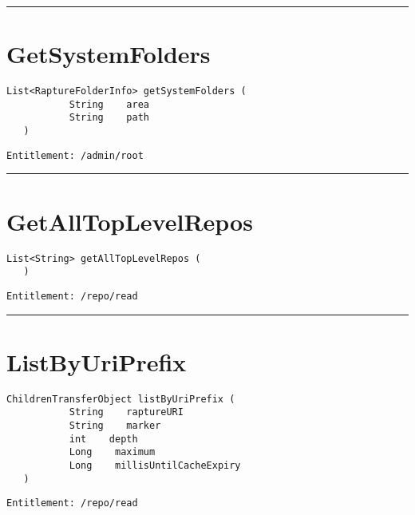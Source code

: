 \rule{12cm}{2pt}
\section{GetSystemFolders}
\label{Api:GetSystemFolders}
\begin{lstlisting}[style=nonumbers]
   List<RaptureFolderInfo> getSystemFolders (
           String    area
           String    path
   )
\end{lstlisting}
\begin{Verbatim}[formatcom=\color{Maroon}]
  Entitlement: /admin/root
\end{Verbatim}



\rule{12cm}{2pt}
\section{GetAllTopLevelRepos}
\label{Api:GetAllTopLevelRepos}
\begin{lstlisting}[style=nonumbers]
   List<String> getAllTopLevelRepos (
   )
\end{lstlisting}
\begin{Verbatim}[formatcom=\color{Maroon}]
  Entitlement: /repo/read
\end{Verbatim}



\rule{12cm}{2pt}
\section{ListByUriPrefix}
\label{Api:ListByUriPrefix}
\begin{lstlisting}[style=nonumbers]
   ChildrenTransferObject listByUriPrefix (
           String    raptureURI
           String    marker
           int    depth
           Long    maximum
           Long    millisUntilCacheExpiry
   )
\end{lstlisting}
\begin{Verbatim}[formatcom=\color{Maroon}]
  Entitlement: /repo/read
\end{Verbatim}



